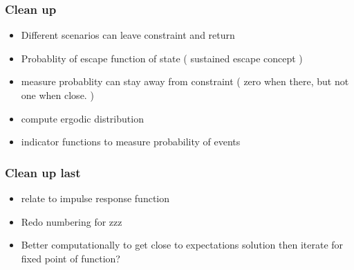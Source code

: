\documentclass{beamer}
\begin{document}
   \begin{frame}
     \frametitle{Clean up}
     \begin{itemize}
\item Different scenarios can leave constraint and return
\item Probablity of escape function of state  ( sustained escape concept )
\item measure probablity can stay away from constraint  ( zero when there, but not one when close. )
\item compute ergodic distribution
\item indicator functions to measure probability of events
     \end{itemize}
   \end{frame}
   \begin{frame}
     \frametitle{Clean up last}
     \begin{itemize}
     \item relate to \cite{hintermaier10,Christiano2000} impulse response function
\item Redo numbering for zzz
\item Better computationally to get close to expectations solution then iterate for fixed point of function?
     \end{itemize}
   \end{frame}
\end{document}
